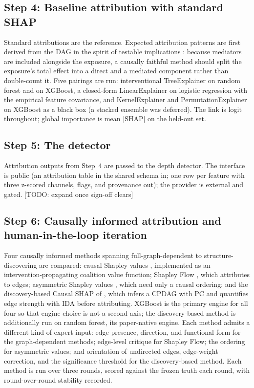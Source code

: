 \documentclass[11pt]{article}
\newcommand{\todo}[1]{\textcolor{red!70!black}{[TODO: #1]}}
\begin{document}
\subsection*{Step 4: Baseline attribution with standard SHAP}
Standard attributions are the reference. Expected attribution patterns are
first derived from the DAG in the spirit of testable implications
\citep{Reynolds2022}: because mediators are included alongside the exposure,
a causally faithful method should split the exposure's total effect into a
direct and a mediated component rather than double-count it. Five pairings
are run: interventional TreeExplainer on random forest and on XGBoost, a
closed-form LinearExplainer on logistic regression with the empirical
feature covariance, and KernelExplainer and PermutationExplainer on XGBoost
as a black box (a stacked ensemble was deferred). The link is logit
throughout; global importance is mean $|$SHAP$|$ on the held-out set.

\subsection*{Step 5: The detector}
Attribution outputs from Step~4 are passed to the depth detector. The
interface is public (an attribution table in the shared schema in; one row
per feature with three z-scored channels, flags, and provenance out); the
provider is external and gated. \todo{expand once sign-off clears}

\subsection*{Step 6: Causally informed attribution and human-in-the-loop iteration}
Four causally informed methods spanning full-graph-dependent to
structure-discovering are compared: causal Shapley values
\citep{Heskes2020}, implemented as an intervention-propagating coalition
value function; Shapley Flow \citep{Wang2021}, which attributes to edges;
asymmetric Shapley values \citep{Frye2020}, which need only a causal
ordering; and the discovery-based Causal SHAP of \citet{Ng2025}, which
infers a CPDAG with PC and quantifies edge strength with IDA before
attributing. XGBoost is the primary engine for all four so that engine
choice is not a second axis; the discovery-based method is additionally
run on random forest, its paper-native engine. Each method admits a
different kind of expert input: edge presence, direction, and functional
form for the graph-dependent methods; edge-level critique for Shapley Flow;
the ordering for asymmetric values; and orientation of undirected edges,
edge-weight correction, and the significance threshold for the
discovery-based method. Each method is run over three rounds, scored against
the frozen truth each round, with round-over-round stability recorded.
\end{document}
